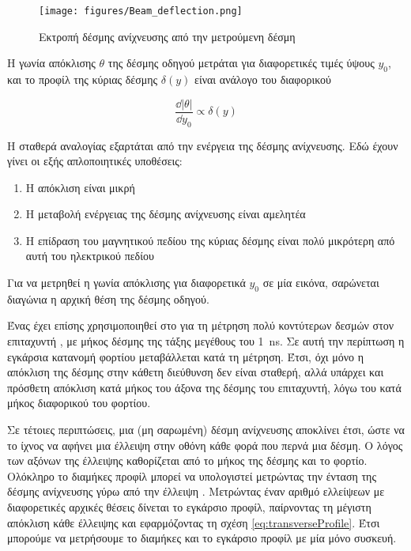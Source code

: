 \begin{figure}[tph]
\texttt{[image: figures/Beam\_deflection.png]}
\centering
\caption{Εκτροπή δέσμης ανίχνευσης από την μετρούμενη δέσμη}
\label{fig:beam-deflection}
\end{figure}

Η γωνία απόκλισης $\theta$ της δέσμης οδηγού μετράται για διαφορετικές τιμές ύψους $y_0$, και το προφίλ της κύριας δέσμης $\delta (y)$ είναι ανάλογο του διαφορικού  \cite{Blokland2009}

\begin{equation} \label{eq:transverseProfile}
\frac{\dd{} |\theta|}{\dd y_0} \propto \delta (y)
\end{equation}

Η σταθερά αναλογίας εξαρτάται από την ενέργεια της δέσμης ανίχνευσης. 
Εδώ έχουν γίνει οι εξής απλοποιητικές υποθέσεις:
\begin{enumerate}
\item Η απόκλιση είναι μικρή
\item Η μεταβολή ενέργειας της δέσμης ανίχνευσης είναι αμελητέα 
\item Η επίδραση του μαγνητικού πεδίου της κύριας δέσμης είναι πολύ μικρότερη από αυτή του ηλεκτρικού πεδίου
\end{enumerate} 

Για να μετρηθεί η γωνία απόκλισης για διαφορετικά $y_0$ σε μία εικόνα, σαρώνεται διαγώνια η αρχική θέση της δέσμης οδηγού. 


Ένας  έχει επίσης χρησιμοποιηθεί στο  για τη μέτρηση πολύ κοντύτερων δεσμών στον επιταχυντή  \cite{Logatchov2006}, με μήκος δέσμης της τάξης μεγέθους του \SI{1}{\nano \second}.
Σε αυτή την περίπτωση η εγκάρσια κατανομή φορτίου μεταβάλλεται κατά τη μέτρηση.
Έτσι, όχι μόνο η απόκλιση της δέσμης στην κάθετη διεύθυνση δεν είναι σταθερή, αλλά υπάρχει και πρόσθετη απόκλιση κατά μήκος του άξονα της δέσμης του επιταχυντή, λόγω του κατά μήκος διαφορικού του φορτίου.

Σε τέτοιες περιπτώσεις, μια (μη σαρωμένη) δέσμη ανίχνευσης αποκλίνει έτσι, ώστε να το ίχνος να αφήνει μια έλλειψη στην οθόνη κάθε φορά που περνά μια δέσμη.
Ο λόγος των αξόνων της έλλειψης καθορίζεται από το μήκος της δέσμης και το φορτίο.
Ολόκληρο το διαμήκες προφίλ μπορεί να υπολογιστεί μετρώντας την ένταση της δέσμης ανίχνευσης γύρω από την έλλειψη \cite{Logatchov1999}.
Μετρώντας έναν αριθμό ελλείψεων με διαφορετικές αρχικές θέσεις δίνεται το εγκάρσιο προφίλ, παίρνοντας τη μέγιστη απόκλιση κάθε έλλειψης και εφαρμόζοντας τη σχέση \ref{eq:transverseProfile}.
Έτσι μπορούμε να μετρήσουμε το διαμήκες και το εγκάρσιο προφίλ με μία μόνο συσκευή.


